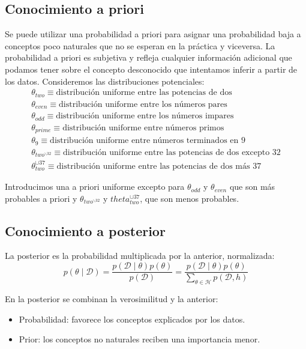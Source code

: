 \subsection{Conocimiento a priori}
Se puede utilizar una probabilidad a priori para asignar una probabilidad baja a conceptos poco naturales que no se esperan en la práctica y viceversa. La probabilidad a priori es subjetiva y refleja cualquier información adicional que podamos tener sobre el concepto desconocido que intentamos inferir a partir de los datos. Consideremos las distribuciones potenciales:
\begin{align*}
\theta_{two} \equiv \text{distribución uniforme entre las potencias de dos} \\
\theta_{even} \equiv \text{distribución uniforme entre los números pares} \\
\theta_{odd} \equiv \text{distribución uniforme entre los números impares} \\
\theta_{prime} \equiv \text{distribución uniforme entre números primos} \\
\theta_{9} \equiv \text{distribución uniforme entre números terminados en 9} \\
\theta_{two^{\backslash 32}} \equiv \text{distribución uniforme entre las potencias de dos excepto 32} \\
\theta_{two}^{\cup 37} \equiv \text{distribución uniforme entre las potencias de dos más 37}
\end{align*}

Introducimos una a priori uniforme excepto para $\theta_{odd}$ y $\theta_{even}$ que son más
probables a priori y $\theta_{two^{\backslash 32}}$ y  $theta_{two}^{\cup 37}$, que son menos probables.

\subsection{Conocimiento a posterior}
La posterior es la probabilidad multiplicada por la anterior, normalizada:
$$p(\theta \mid \mathcal{D}) = \frac{p(\mathcal{D} \mid \theta)p(\theta)}{p(\mathcal{D})} = \frac{p(\mathcal{D} \mid \theta) p(\theta)}{\sum_{\theta \in \mathcal{H}} p(\mathcal{D}, h)}$$

En la posterior se combinan la verosimilitud y la anterior:
\begin{itemize}
\item Probabilidad: favorece los conceptos explicados por los datos.
\item Prior: los conceptos no naturales reciben una importancia menor.
\end{itemize}

